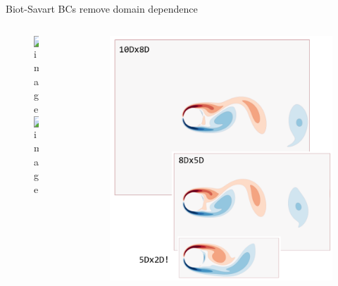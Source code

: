 \documentclass[aspectratio=169,small]{beamer}
\begin{document}
\begin{frame}[fragile]{Biot-Savart BCs remove domain dependence} %
    \begin{columns}[onlytextwidth]
        \begin{column}{.5\textwidth}
        \begin{figure}
            \centering
            \includegraphics<1>[height=0.7\textwidth]{fig/start.png}
            \includegraphics<2>[height=0.7\textwidth]{fig/fft.png}
        \end{figure}
        \end{column}
        \begin{column}{.5\textwidth}
        \begin{figure}
            \centering
            \includegraphics[height=0.95\textwidth]{fig/domains.png}
        \end{figure}
        \end{column}
    \end{columns}
\end{frame}
\end{document}

